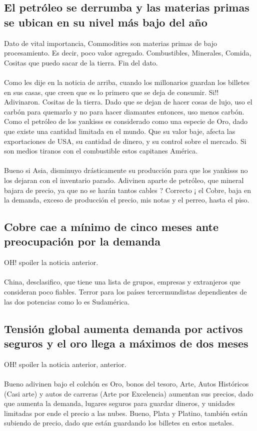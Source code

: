 \subsection{El petróleo se derrumba y las materias primas se ubican en su nivel más bajo del año}
Dato de vital importancia, Commodities son materias primas de bajo procesamiento. Es decir, poco valor agregado. Combustibles, Minerales, Comida, Cositas que puedo sacar de la tierra. Fin del dato. 
\\
\\
Como les dije en la noticia de arriba, cuando los millonarios guardan los billetes en sus casas, que creen que es lo primero que se deja de consumir. Si!! Adivinaron. Cositas de la tierra. Dado que se dejan de hacer cosas de lujo, uso el carbón para quemarlo y no para hacer diamantes entonces, uso menos carbón.  Como el petróleo de los yankisss es considerado como una especie de Oro, dado que existe una cantidad limitada en el mundo. Que su valor baje, afecta las exportaciones de USA, su cantidad de dinero, y su control sobre el mercado. Si son medios tiranos con el combustible estos capitanes América.
\\
\\
Bueno si Asia, disminuyo drásticamente su producción para que los yankisss no los dejaran con el inventario parado. Adivinen aparte de petróleo, que mineral bajara de precio, ya que no se harán tantos cables ?  Correcto ¡ el Cobre, baja en la demanda, exceso de producción el precio, mis notas y el perreo, hasta el piso.  
\subsection{Cobre cae a mínimo de cinco meses ante preocupación por la demanda}

OH! spoiler la noticia anterior. 
\\
\\
China, desclasifico, que tiene una lista de grupos, empresas y extranjeros que consideran poco fiables. Terror para los países tercermundistas dependientes de las dos potencias como lo es Sudamérica. 
\subsection{Tensión global aumenta demanda por activos seguros y el oro llega a máximos de dos meses}

OH! spoiler la noticia anterior, anterior. 
\\
\\
Bueno adivinen bajo el colchón es Oro, bonos del tesoro, Arte, Autos Históricos (Casi arte) y autos de carreras (Arte por Excelencia) aumentan sus precios, dado que aumenta la demanda, lugares seguros para guardar dineros, y unidades limitadas por ende el precio a las nubes.  Bueno, Plata y Platino, también están subiendo de precio, dado que están guardando los billetes en estos metales. 


